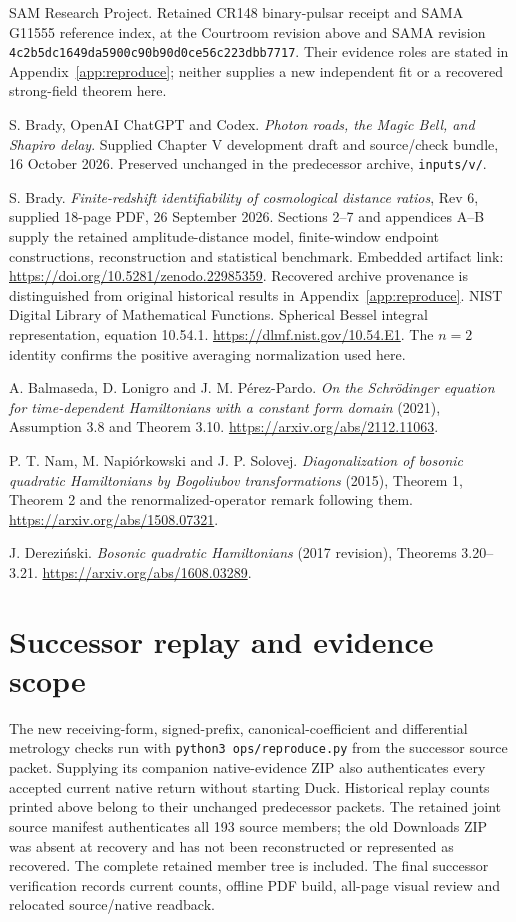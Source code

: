 \documentclass[10pt,twocolumn,letterpaper]{article}
\begin{document}
\noindent[17] SAM Research Project. Retained CR148 binary-pulsar receipt and SAMA G11555 reference index, at the Courtroom revision above and SAMA revision \nolinkurl{4c2b5dc1649da5900c90b90d0ce56c223dbb7717}. Their evidence roles are stated in Appendix~\ref{app:reproduce}; neither supplies a new independent fit or a recovered strong-field theorem here.

\noindent[18] S. Brady, OpenAI ChatGPT and Codex. \emph{Photon roads, the Magic Bell, and Shapiro delay}. Supplied Chapter V development draft and source/check bundle, 16 October 2026. Preserved unchanged in the predecessor archive, \texttt{inputs/v/}.

\noindent[19] S. Brady. \emph{Finite-redshift identifiability of cosmological distance ratios}, Rev 6, supplied 18-page PDF, 26 September 2026. Sections 2--7 and appendices A--B supply the retained amplitude-distance model, finite-window endpoint constructions, reconstruction and statistical benchmark. Embedded artifact link: \url{https://doi.org/10.5281/zenodo.22985359}. Recovered archive provenance is distinguished from original historical results in Appendix~\ref{app:reproduce}.
\noindent[20] NIST Digital Library of Mathematical Functions. Spherical Bessel integral representation, equation 10.54.1. \url{https://dlmf.nist.gov/10.54.E1}. The $n=2$ identity confirms the positive averaging normalization used here.


\noindent[21] A. Balmaseda, D. Lonigro and J. M. P\'erez-Pardo.
\emph{On the Schr\"odinger equation for time-dependent Hamiltonians with
a constant form domain} (2021), Assumption 3.8 and Theorem 3.10.
\url{https://arxiv.org/abs/2112.11063}.

\noindent[22] P. T. Nam, M. Napi\'orkowski and J. P. Solovej.
\emph{Diagonalization of bosonic quadratic Hamiltonians by Bogoliubov
transformations} (2015), Theorem 1, Theorem 2 and the renormalized-operator
remark following them. \url{https://arxiv.org/abs/1508.07321}.


\noindent[23] J. Derezi\'nski. \emph{Bosonic quadratic Hamiltonians}
(2017 revision), Theorems 3.20--3.21.
\url{https://arxiv.org/abs/1608.03289}.
\par\endgroup

\section*{Successor replay and evidence scope}
The new receiving-form, signed-prefix, canonical-coefficient and differential
metrology checks run with \texttt{python3 ops/reproduce.py} from the successor
source packet. Supplying its companion native-evidence ZIP also authenticates
every accepted current native return without starting Duck. Historical replay
counts printed above belong to their unchanged predecessor packets.
The retained joint source manifest authenticates all 193 source members;
the old Downloads ZIP was absent at recovery and has not been reconstructed
or represented as recovered. The complete retained member tree is included.
The final successor verification records current counts, offline PDF build,
all-page visual review and relocated source/native readback.
\end{document}
